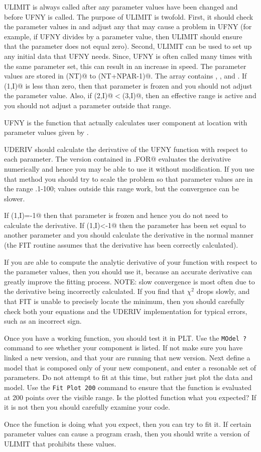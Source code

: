 ULIMIT is always called after any parameter values have been changed
and before UFNY is called.
The purpose of ULIMIT is twofold.
First, it should check the parameter values in \verb@PVAL@ and adjust
any that may cause a problem in UFNY (for example, if UFNY divides
by a parameter value, then ULIMIT should ensure that the parameter
does not equal zero).
Second, ULIMIT can be used to set up any initial data that UFNY needs.
Since, UFNY is often called many times with the same parameter set,
this can result in an increase in speed.
The parameter values are stored in \verb@PVAL(NT)@ to \verb@PVAL(NT+NPAR-1)@.
The \verb@PLIM@ array contains \verb@SIG@, \verb@PLO@, and \verb@PHI@.
If \verb@PLIM(1,I)@ is less than zero,
then that parameter is frozen and you should not adjust the parameter
value.
Also, if \verb@PLIM(2,I)@$<$\verb@PLIM(3,I)@, then an effective range
is active and you should not adjust a parameter outside that range.

UFNY is the function that actually calculates user component at
location \verb@X@ with parameter values given by \verb@PVAL@.

UDERIV should calculate the derivative of the UFNY function with respect
to each parameter.  The version contained in \verb@UFNYDEMO.FOR@
evaluates the derivative numerically and hence you may be able to
use it without modification.  If you use that method you should try
to scale the problem so that parameter values are in the range .1-100;
values outside this range work, but the convergence can be slower.

If \verb@PLIM(1,I)=-1@ then that parameter is frozen and hence you do not
need to calculate the derivative.  If \verb@PLIM(1,I)<-1@ then the parameter
has been set equal to another parameter and you should calculate the
derivative in the normal manner (the FIT routine assumes that the
derivative has been correctly calculated).

If you are able to compute the analytic derivative of your function with
respect to the parameter values, then you should use it, because an accurate
derivative can greatly improve the fitting process.  NOTE: slow
convergence is most often due to the derivative being incorrectly
calculated.  If you find that $\chi^2$ drops slowly, and that FIT is
unable to precisely locate the minimum, then you should carefully
check both your equations and the UDERIV implementation for typical
errors, such as an incorrect sign.

Once you have a working function, you should test it in PLT.
Use the {\tt MOdel~?} command to see whether your component is listed.
If not make sure you have linked a new version,
and that your are running that new version.
Next define a model that is composed only of your new component,
and enter a resonable set of parameters.
Do not attempt to fit at this time,
but rather just plot the data and model.
Use the {\tt Fit~Plot~200} command to ensure that the function is
evaluated at 200 points over the visible range.
Is the plotted function what you expected?
If it is not then you should carefully examine your code.

Once the function is doing what you expect, then you can try to fit
it.  If certain parameter values can cause a program crash, then you
should write a version of ULIMIT that prohibits these values.

\flushbottom
